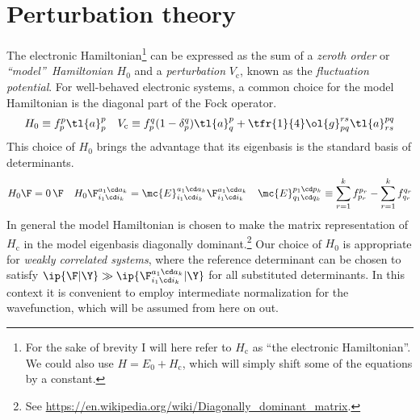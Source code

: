 \chapter{Perturbation theory}

\begin{dfn}
The electronic Hamiltonian\footnote{For the sake of brevity I will here refer to $H_{\text{c}}$ as ``the electronic Hamiltonian''.  We could also use $H=E_0+H_{\text{c}}$, which will simply shift some of the equations by a constant.} can be expressed as the sum of a \textit{zeroth order} or \textit{``model''~Hamiltonian} $H_0$ and a \textit{perturbation} $V_{\text{c}}$, known as the \textit{fluctuation potential}.
For well-behaved electronic systems, a common choice for the model Hamiltonian is the diagonal part of the Fock operator.
\begin{align}
\label{eq:diagonal-fock-model-hamiltonian}
  H_0
\equiv
  f_p^p
  \tl{a}^p_p
&&
  V_{\text{c}}
\equiv
  f_p^q
  (
    1
  -
    \delta_p^q
  )
  \tl{a}^p_q
+
  \tfr{1}{4}
  \ol{g}_{pq}^{rs}
  \tl{a}^{pq}_{rs}
\end{align}
This choice of $H_0$ brings the advantage that its eigenbasis is the standard basis of determinants.
\begin{align}
\label{eq:model-problem}
  H_0
  \F
=
  0\,
  \F
&&
  H_0
  \F_{i_1\cd i_k}^{a_1\cd a_k}
=
  \mc{E}_{i_1\cd i_k}^{a_1\cd a_k}
  \F_{i_1\cd i_k}^{a_1\cd a_k}
&&
  \mc{E}_{q_1\cd q_k}^{p_1\cd p_k}
\equiv
  \sum_{r=1}^k
  f_{p_r}^{p_r}
-
  \sum_{r=1}^k
  f_{q_r}^{q_r}
\end{align}
In general the model Hamiltonian is chosen to make the matrix representation of $H_{\text{c}}$ in the model eigenbasis diagonally dominant.\footnote{See \url{https://en.wikipedia.org/wiki/Diagonally_dominant_matrix}.}
Our choice of $H_0$ is appropriate for \textit{weakly correlated systems}, where the reference determinant can be chosen to satisfy $\ip{\F|\Y}\gg \ip{\F_{i_1\cd i_k}^{a_1\cd a_k}|\Y}$ for all substituted determinants.
In this context it is convenient to employ intermediate normalization for the wavefunction, which will be assumed from here on out.
\end{dfn}


